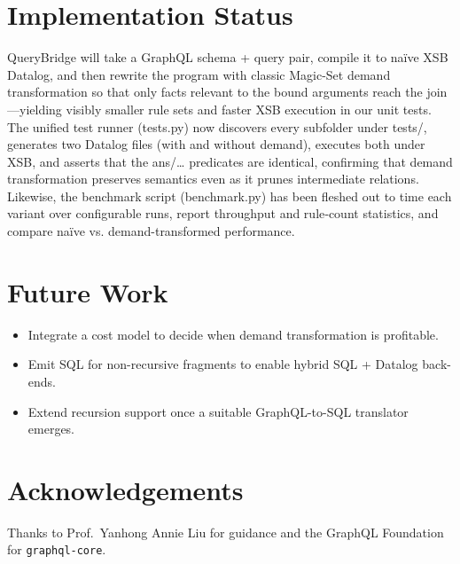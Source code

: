 \documentclass[11pt]{article}
\begin{document}
\section{Implementation Status}
QueryBridge will take a GraphQL schema + query pair, compile it to naïve XSB Datalog, and then rewrite the program with classic Magic-Set demand transformation so that only facts relevant to the bound arguments reach the join—yielding visibly smaller rule sets and faster XSB execution in our unit tests. The unified test runner (tests.py) now discovers every subfolder under tests/, generates two Datalog files (with and without demand), executes both under XSB, and asserts that the ans/… predicates are identical, confirming that demand transformation preserves semantics even as it prunes intermediate relations. Likewise, the benchmark script (benchmark.py) has been fleshed out to time each variant over configurable runs, report throughput and rule‐count statistics, and compare naïve vs. demand-transformed performance.

\section{Future Work}
\begin{itemize}[leftmargin=1.5em]
  \item Integrate a cost model to decide when demand transformation is profitable.
  \item Emit SQL for non-recursive fragments to enable hybrid SQL + Datalog back-ends.
  \item Extend recursion support once a suitable GraphQL-to-SQL translator emerges.
\end{itemize}

\section*{Acknowledgements}
Thanks to Prof.\ Yanhong Annie Liu for guidance and the GraphQL Foundation for
\texttt{graphql-core}.
\end{document}
